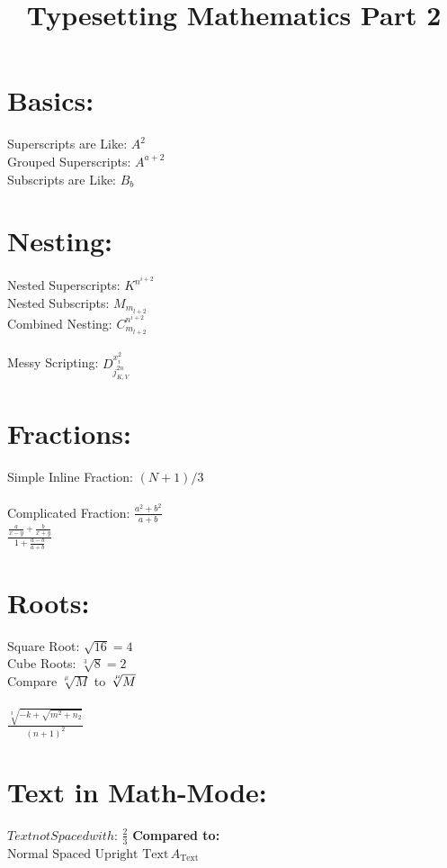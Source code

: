 \documentclass{article}
\title{Typesetting Mathematics Part 2}
\date{}
\begin{document}
	\maketitle
	\section{Basics:}
	\noindent
	Superscripts are Like: $A^2$ \\
  	Grouped Superscripts: $A^{a+2}$ \\
  	Subscripts are Like: $B_b$ \\
  	\section{Nesting:}
  	Nested Superscripts: $K^{n^{i+2}}$ \\
  	Nested Subscripts: $M_{m_{l+2}}$
  	\vspace{2mm} \ \\
  	Combined Nesting: $C_{m_{l+2}}^{n^{i+2}}$ \\
  	\vspace{3mm} \ \\
  	Messy Scripting: $D^{x_i^2}_{j^{2n}_{K, V}}$
  	
  	\section{Fractions:}
  	Simple Inline Fraction: $(N+1)/3$ \\
  	\vspace{3mm} \ \\
  	Complicated Fraction: $\frac{a^2+b^2}{a+b}$ \\
  	
  	$\frac{\frac{a}{x-y}+\frac{b}{x+y}}{1+\frac{a-b}{a				+b}}$
  	
  	\section{Roots:}
  	Square Root: $\sqrt{16} = 4$ \\
  	Cube Roots: $\sqrt[3]{8} = 2$ \\
  	Compare $\sqrt[\mu]{M}$ to 
  		$\sqrt[\leftroot{-2}\uproot{2}\mu]{M}$ \\
  	\vspace{3mm} \ \\
  	$\frac{\sqrt[3]{-k+\sqrt{m^2+n_2}}}{(n+1)^2}$
  	
  	\section{Text in Math-Mode:}
  	$Text not Spaced with:\, \frac{2}{3}$
  	\textbf{Compared to:} \\
  	$\mbox{Normal Spaced Upright Text}\, 
  		A_\mathrm{Text}$
  		
\end{document}
